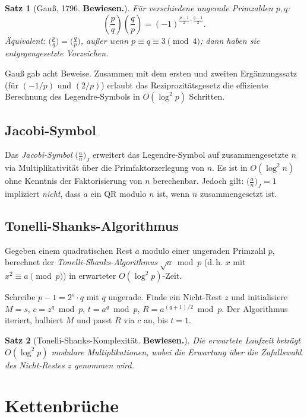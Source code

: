 \documentclass[12pt,a4paper]{amsart}
\newtheorem{theorem}{Satz}[section]
\theoremstyle{definition}
\begin{document}
\begin{theorem}[Gauß, 1796. \textbf{Bewiesen.}]
Für verschiedene ungerade Primzahlen $p, q$:
\[
  \left(\frac{p}{q}\right)\left(\frac{q}{p}\right) =
  (-1)^{\tfrac{p-1}{2}\cdot\tfrac{q-1}{2}}.
\]
Äquivalent: $\bigl(\frac{p}{q}\bigr) = \bigl(\frac{q}{p}\bigr)$,
außer wenn $p \equiv q \equiv 3 \pmod{4}$; dann haben sie entgegengesetzte Vorzeichen.
\end{theorem}

Gauß gab acht Beweise. Zusammen mit dem ersten und zweiten Ergänzungssatz
(für $(-1/p)$ und $(2/p)$) erlaubt das Reziprozitätsgesetz die effiziente
Berechnung des Legendre-Symbols in $O(\log^2 p)$ Schritten.

\subsection{Jacobi-Symbol}

Das \emph{Jacobi-Symbol} $\bigl(\frac{a}{n}\bigr)_J$ erweitert das Legendre-Symbol
auf zusammengesetzte $n$ via Multiplikativität über die Primfaktorzerlegung von $n$.
Es ist in $O(\log^2 n)$ ohne Kenntnis der Faktorisierung von $n$ berechenbar.
Jedoch gilt: $\bigl(\frac{a}{n}\bigr)_J = 1$ impliziert \emph{nicht}, dass $a$
ein QR modulo $n$ ist, wenn $n$ zusammengesetzt ist.

\subsection{Tonelli-Shanks-Algorithmus}

Gegeben einem quadratischen Rest $a$ modulo einer ungeraden Primzahl $p$,
berechnet der \emph{Tonelli-Shanks-Algorithmus} $\sqrt{a} \bmod p$ (d.\,h.
$x$ mit $x^2 \equiv a \pmod p$) in erwarteter $O(\log^2 p)$-Zeit.

Schreibe $p-1 = 2^s \cdot q$ mit $q$ ungerade. Finde ein Nicht-Rest $z$ und
initialisiere $M = s$, $c = z^q \bmod p$, $t = a^q \bmod p$, $R = a^{(q+1)/2} \bmod p$.
Der Algorithmus iteriert, halbiert $M$ und passt $R$ via $c$ an, bis $t = 1$.

\begin{theorem}[Tonelli-Shanks-Komplexität. \textbf{Bewiesen.}]
Die erwartete Laufzeit beträgt $O(\log^2 p)$ modulare Multiplikationen, wobei
die Erwartung über die Zufallswahl des Nicht-Restes $z$ genommen wird.
\end{theorem}

\section{Kettenbrüche}
\end{document}
